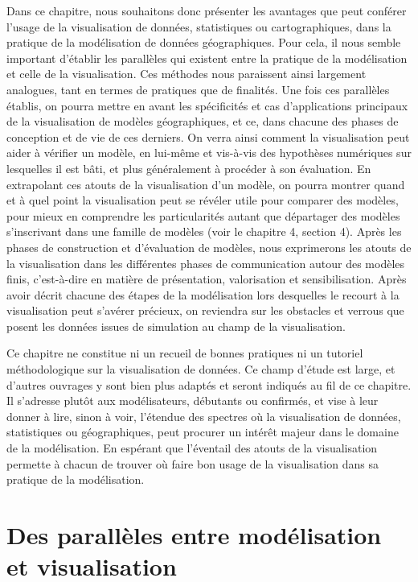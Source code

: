 \documentclass[a4paper, 12pt]{article}
\begin{document}
Dans ce chapitre, nous souhaitons donc présenter les avantages que peut conférer l'usage de la visualisation de données, statistiques ou cartographiques, dans la pratique de la modélisation de données géographiques.
Pour cela, il nous semble important d'établir les parallèles qui existent entre la pratique de la modélisation et celle de la visualisation.
Ces méthodes nous paraissent ainsi largement analogues, tant en termes de pratiques que de finalités.
Une fois ces parallèles établis, on pourra mettre en avant les spécificités et cas d'applications principaux de la visualisation de modèles géographiques, et ce, dans chacune des phases de conception et de vie de ces derniers.
On verra ainsi comment la visualisation peut aider à vérifier un modèle, en lui-même et vis-à-vis des hypothèses numériques sur lesquelles il est bâti, et plus généralement à procéder à son évaluation.
En extrapolant ces atouts de la visualisation d'un modèle, on pourra montrer quand et à quel point la visualisation peut se révéler utile pour comparer des modèles, pour mieux en comprendre les particularités autant que départager des modèles s'inscrivant dans une famille de modèles (voir le chapitre 4, section 4).
Après les phases de construction et d'évaluation de modèles, nous exprimerons les atouts de la visualisation dans les différentes phases de communication autour des modèles finis, c'est-à-dire en matière de présentation, valorisation et sensibilisation.
Après avoir décrit chacune des étapes de la modélisation lors desquelles le recourt à la visualisation peut s'avérer précieux, on reviendra sur les obstacles et verrous que posent les données issues de simulation au champ de la visualisation.

Ce chapitre ne constitue ni un recueil de bonnes pratiques ni un tutoriel méthodologique sur la visualisation de données. Ce champ d'étude est large, et d'autres ouvrages y sont bien plus adaptés et seront indiqués au fil de ce chapitre. Il s'adresse plutôt aux modélisateurs, débutants ou confirmés, et vise à leur donner à lire, sinon à voir, l'étendue des spectres où la visualisation de données, statistiques ou géographiques, peut procurer un intérêt majeur dans le domaine de la modélisation. En espérant que l'éventail des atouts de la visualisation permette à chacun de trouver où faire bon usage de la visualisation dans sa pratique de la modélisation.

\section{Des parallèles entre modélisation et visualisation}
\end{document}
